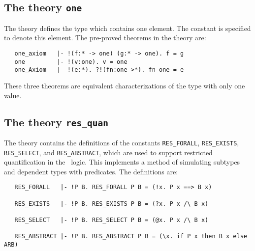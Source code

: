 \subsection{The theory {\tt one}}%
%
%

The theory  defines  the type   which  contains one element.
The constant    is specified  to denote  this element.   The pre-proved
theorems in the theory  are:

\begin{hol}
\begin{verbatim}
   one_axiom   |- !(f:* -> one) (g:* -> one). f = g
   one         |- !(v:one). v = one
   one_Axiom   |- !(e:*). ?!(fn:one->*). fn one = e
\end{verbatim}\end{hol}

\noindent These three theorems are equivalent characterizations of the type
with only one value.

\subsection{The theory {\tt res\_quan}}\label{res-quant}


The theory  contains the definitions of the constants
{\small\verb!RES_FORALL!}, {\small\verb!RES_EXISTS!},
{\small\verb!RES_SELECT!}, and {\small\verb!RES_ABSTRACT!},
which are used to support restricted
quantification in the \HOL\ logic.  This
implements a method of simulating subtypes and dependent types with
predicates. The definitions are:

\begin{hol}
\begin{verbatim}
   RES_FORALL   |- !P B. RES_FORALL P B = (!x. P x ==> B x)

   RES_EXISTS   |- !P B. RES_EXISTS P B = (?x. P x /\ B x)

   RES_SELECT   |- !P B. RES_SELECT P B = (@x. P x /\ B x)

   RES_ABSTRACT |- !P B. RES_ABSTRACT P B = (\x. if P x then B x else ARB)
\end{verbatim}\end{hol}


